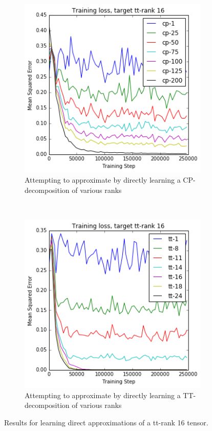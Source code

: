 \begin{figure}
\centering
\begin{subfigure}[t]{0.45\textwidth}
	\includegraphics[width=\textwidth]{tensors/tt16cpapprox}
	\caption{Attempting to approximate by directly learning a 
		CP-decomposition of various ranks}
	\label{fig:ttcpapprox}
\end{subfigure}
~
\begin{subfigure}[t]{0.45\textwidth}
	\includegraphics[width=\textwidth]{tensors/tt16ttapprox}
	\caption{Attempting to approximate by directly learning a TT-decomposition of various ranks}
	\label{fig:ttttapprox}
\end{subfigure}
\caption{Results for learning direct approximations of a tt-rank 16 tensor.}
\label{fig:ttapprox}
\end{figure}


